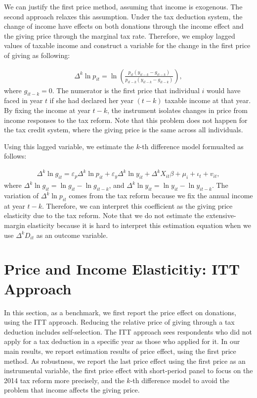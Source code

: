 \documentclass[
  11pt,
  a4paper,
]{article}
\begin{document}
We can justify the first price method, assuming that income is exogenous.
The second approach relaxes this assumption.
Under the tax deduction system,
the change of income have effects on both donations through the income effect
and the giving price through the marginal tax rate.
Therefore,
we employ lagged values of taxable income and
construct a variable for the change in the first price of giving as following:

\begin{align}
  \Delta^k \ln p_{it} = \ln \left(\frac{p_{it}(y_{it-k} - g_{it-k})}{p_{it-k}(y_{it-k} - g_{it-k})}\right),
  \label{eq:laggedp}
\end{align}
where \(g_{it-k} = 0\).
The numerator is the first price that individual \(i\) would have faced in year \(t\)
if she had declared her year \((t - k)\) taxable income at that year.
By fixing the income at year \(t - k\), the instrument isolates changes in price from income responses to the tax reform.
Note that this problem does not happen for the tax credit system, where the giving price is the same across all individuals.

Using this lagged variable, we estimate the \(k\)-th difference model formualted as follows:

\begin{align}
  \Delta^k \ln g_{it} = \varepsilon_p \Delta^k \ln p_{it} + \varepsilon_y \Delta^k \ln y_{it} 
  + \Delta^k X_{it} \beta + \mu_i + \iota_t + v_{it}, \label{eq:kdiff}
\end{align}
where \(\Delta^k \ln g_{it} = \ln g_{it} - \ln g_{it-k}\),
and \(\Delta^k \ln y_{it} = \ln y_{it} - \ln y_{it-k}\).
The variation of \(\Delta^k \ln p_{it}\) comes from the tax reform because we fix the annual income at year \(t - k\).
Therefore, we can interpret this coefficient as the giving price elasticity due to the tax reform.
Note that we do not estimate the extensive-margin elasticity because it is hard to interpret this estimation equation when we use \(\Delta^k D_{it}\) as an outcome variable.

\hypertarget{price-and-income-elasticitiy-itt-approach}{%
\section{Price and Income Elasticitiy: ITT Approach}\label{price-and-income-elasticitiy-itt-approach}}

In this section, as a benchmark, we first report the price effect on donations, using the ITT approach.
Reducing the relative price of giving through a tax deduction includes self-selection.
The ITT approach sees respondents who did not apply for a tax deduction in a specific year as those who applied for it.
In our main results, we report estimation results of price effect, using the first price method.
As robustness, we report the last price effect using the first price as an instrumental variable,
the first price effect with short-period panel to focus on the 2014 tax reform more precisely,
and the \(k\)-th difference model to avoid the problem that income affects the giving price.
\end{document}
